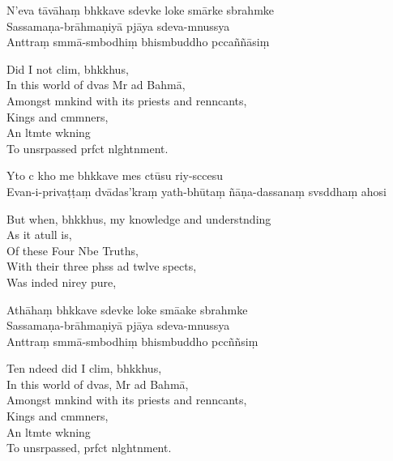 N'eva tāvāhaṃ bhkkave sdevke loke smārke sbrahmke\\
Sassamaṇa-brāhmaṇiyā pjāya sdeva-mnussya\\
Anttraṃ smmā-smbodhiṃ bhismbuddho pccaññāsiṃ

\begin{english}
  Did I not clim, bhkkhus,\\
  In this world of dvas Mr ad Bahmā,\\
  Amongst mnkind with its priests and renncants,\\
  Kings and cmmners,\\
  An ltmte wkning\\
  To unsrpassed prfct nlghtnment.
\end{english}

Yto c kho me bhkkave mes ctūsu riy-sccesu\\
Evan-i-privaṭṭaṃ dvādas'kraṃ yath-bhūtaṃ ñāṇa-dassanaṃ svsddhaṃ ahosi

\begin{english}
  But when, bhkkhus, my knowledge and understnding\\
  As it atull is,\\
  Of these Four Nbe Truths,\\
  With their three phss ad twlve spects,\\
  Was inded nirey pure,
\end{english}

Athāhaṃ bhkkave sdevke loke smāake sbrahmke\\
Sassamaṇa-brāhmaṇiyā pjāya sdeva-mnussya\\
Anttraṃ smmā-smbodhiṃ bhismbuddho pccññsiṃ

\begin{english}
  Ten ndeed did I clim, bhkkhus,\\
  In this world of dvas, Mr ad Bahmā,\\
  Amongst mnkind with its priests and renncants,\\
  Kings and cmmners,\\
  An ltmte wkning\\
  To unsrpassed, prfct nlghtnment.
\end{english}

